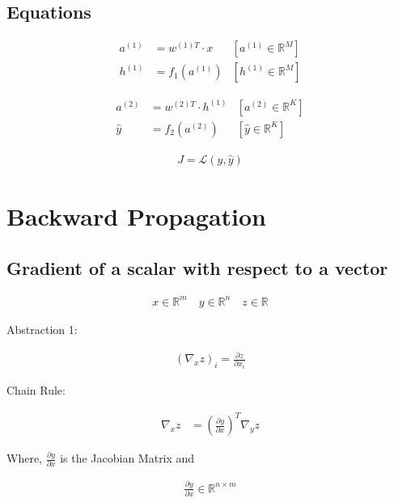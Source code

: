 \documentclass{article}
\begin{document}
\subsection{Equations}

\begin{align}
    a^{(1)} &= w^{(1)T} \cdot x & \left[  a^{(1)} \in \mathbb{R}^M \right] \\
    h^{(1)} &= f_1(a^{(1)}) & \left[ h^{(1)} \in \mathbb{R}^M \right]
\end{align}

\begin{align}
    a^{(2)} &= w^{(2)T} \cdot h^{(1)} & \left[  a^{(2)} \in \mathbb{R}^K \right] \\
    \hat y  &= f_2(a^{(2)}) & \left[  \hat y \in \mathbb{R}^K \right]
\end{align}

\begin{align}
    J = \mathcal{L}(y, \hat  y)
\end{align}

\pagebreak


\section{Backward Propagation}

\subsection{Gradient of a scalar with respect to a vector}
    
\begin{align}
    x \in \mathbb{R}^m \quad y \in \mathbb{R}^n \quad z \in \mathbb{R}
\end{align}

Abstraction 1:

\begin{align}
    \left( \nabla_xz \right)_i = \frac{\partial z}{\partial x_i}
\end{align}

Chain Rule:

\begin{align}
    \nabla_{x}z &= \left( \frac{\partial y}{\partial x} \right)^T  \nabla_{y}z
\end{align}

Where, $\frac{\partial y}{\partial x}$ is the Jacobian Matrix and

\begin{align}
    \frac{\partial y}{\partial x} \in \mathbb{R}^{n \times m}
\end{align}
\end{document}
